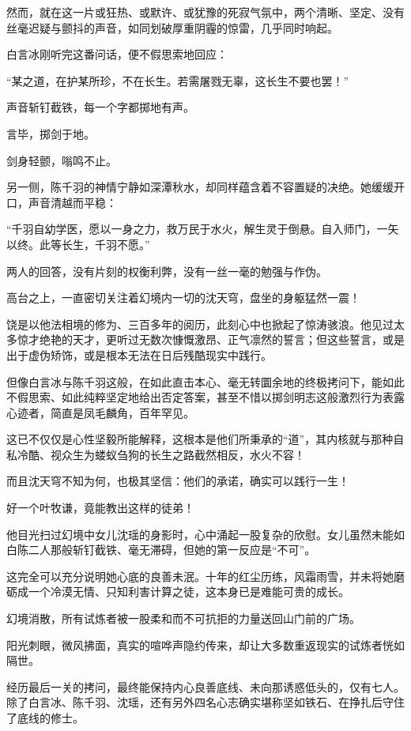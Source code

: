 然而，就在这一片或狂热、或默许、或犹豫的死寂气氛中，两个清晰、坚定、没有丝毫迟疑与颤抖的声音，如同划破厚重阴霾的惊雷，几乎同时响起。

白言冰刚听完这番问话，便不假思索地回应：

“某之道，在护某所珍，不在长生。若需屠戮无辜，这长生不要也罢！”

声音斩钉截铁，每一个字都掷地有声。

言毕，掷剑于地。

剑身轻颤，嗡鸣不止。

另一侧，陈千羽的神情宁静如深潭秋水，却同样蕴含着不容置疑的决绝。她缓缓开口，声音清越而平稳：

“千羽自幼学医，愿以一身之力，救万民于水火，解生灵于倒悬。自入师门，一矢以终。此等长生，千羽不愿。”

两人的回答，没有片刻的权衡利弊，没有一丝一毫的勉强与作伪。

高台之上，一直密切关注着幻境内一切的沈天穹，盘坐的身躯猛然一震！

饶是以他法相境的修为、三百多年的阅历，此刻心中也掀起了惊涛骇浪。他见过太多惊才绝艳的天才，更听过无数次慷慨激昂、正气凛然的誓言；但这些誓言，或是出于虚伪矫饰，或是根本无法在日后残酷现实中践行。

但像白言冰与陈千羽这般，在如此直击本心、毫无转圜余地的终极拷问下，能如此不假思索、如此纯粹坚定地给出否定答案，甚至不惜以掷剑明志这般激烈行为表露心迹者，简直是凤毛麟角，百年罕见。

这已不仅仅是心性坚毅所能解释，这根本是他们所秉承的“道”，其内核就与那种自私冷酷、视众生为蝼蚁刍狗的长生之路截然相反，水火不容！

而且沈天穹不知为何，也极其坚信：他们的承诺，确实可以践行一生！

好一个叶牧谦，竟能教出这样的徒弟！

他目光扫过幻境中女儿沈瑶的身影时，心中涌起一股复杂的欣慰。女儿虽然未能如白陈二人那般斩钉截铁、毫无滞碍，但她的第一反应是“不可”。

这完全可以充分说明她心底的良善未泯。十年的红尘历练，风霜雨雪，并未将她磨砺成一个冷漠无情、只知利害计算之徒，这本身已是难能可贵的成长。

\vspace{2em}

幻境消散，所有试炼者被一股柔和而不可抗拒的力量送回山门前的广场。

阳光刺眼，微风拂面，真实的喧哗声隐约传来，却让大多数重返现实的试炼者恍如隔世。

经历最后一关的拷问，最终能保持内心良善底线、未向那诱惑低头的，仅有七人。除了白言冰、陈千羽、沈瑶，还有另外四名心志确实堪称坚如铁石、在挣扎后守住了底线的修士。

